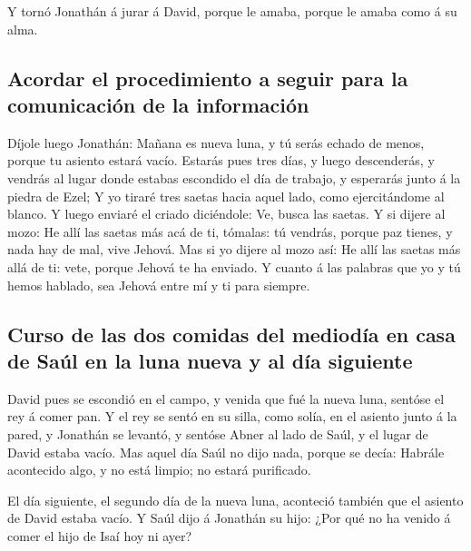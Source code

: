  Y tornó Jonathán á jurar á David, porque le amaba,
porque le amaba como á su alma.

\hypertarget{acordar-el-procedimiento-a-seguir-para-la-comunicaciuxf3n-de-la-informaciuxf3n}{%
\subsection{Acordar el procedimiento a seguir para la comunicación de la
información}\label{acordar-el-procedimiento-a-seguir-para-la-comunicaciuxf3n-de-la-informaciuxf3n}}

 Díjole luego Jonathán: Mañana es nueva luna, y tú serás
echado de menos, porque tu asiento estará vacío.  Estarás
pues tres días, y luego descenderás, y vendrás al lugar donde estabas
escondido el día de trabajo, y esperarás junto á la piedra de Ezel;
 Y yo tiraré tres saetas hacia aquel lado, como
ejercitándome al blanco.  Y luego enviaré el criado
diciéndole: Ve, busca las saetas. Y si dijere al mozo: He allí las
saetas más acá de ti, tómalas: tú vendrás, porque paz tienes, y nada hay
de mal, vive Jehová.  Mas si yo dijere al mozo así: He
allí las saetas más allá de ti: vete, porque Jehová te ha enviado.
 Y cuanto á las palabras que yo y tú hemos hablado, sea
Jehová entre mí y ti para siempre.

\hypertarget{curso-de-las-dos-comidas-del-medioduxeda-en-casa-de-sauxfal-en-la-luna-nueva-y-al-duxeda-siguiente}{%
\subsection{Curso de las dos comidas del mediodía en casa de Saúl en la
luna nueva y al día
siguiente}\label{curso-de-las-dos-comidas-del-medioduxeda-en-casa-de-sauxfal-en-la-luna-nueva-y-al-duxeda-siguiente}}

 David pues se escondió en el campo, y venida que fué la
nueva luna, sentóse el rey á comer pan.  Y el rey se
sentó en su silla, como solía, en el asiento junto á la pared, y
Jonathán se levantó, y sentóse Abner al lado de Saúl, y el lugar de
David estaba vacío.  Mas aquel día Saúl no dijo nada,
porque se decía: Habrále acontecido algo, y no está limpio; no estará
purificado.

 El día siguiente, el segundo día de la nueva luna,
aconteció también que el asiento de David estaba vacío. Y Saúl dijo á
Jonathán su hijo: ¿Por qué no ha venido á comer el hijo de Isaí hoy ni
ayer?

